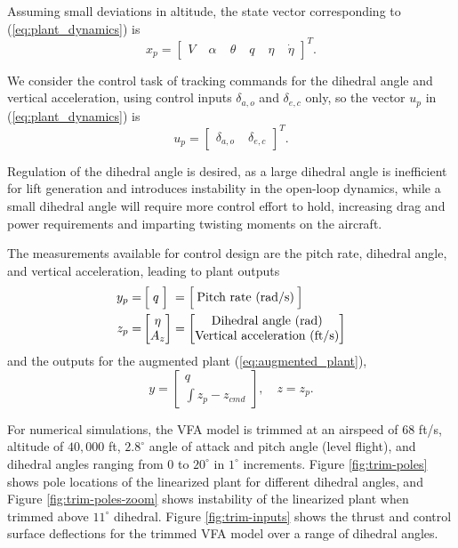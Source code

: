 \documentclass[english]{ifacconf}
\begin{document}
Assuming small deviations in altitude, the state vector corresponding to (\ref{eq:plant_dynamics}) is
\begin{equation}
	x_p = \begin{bmatrix}
V & \; \alpha & \; \theta & \; q & \; \eta & \; \dot{\eta}
\end{bmatrix}^T.
\end{equation}

We consider the control task of tracking commands for the dihedral angle and vertical acceleration, using control inputs $\delta_{a,o}$ and $\delta_{e,c}$ only, so the vector $u_p$ in (\ref{eq:plant_dynamics}) is
\begin{equation}
	u_p = \begin{bmatrix}
\delta_{a,o} & \; \delta_{e,c}
\end{bmatrix}^T.
\end{equation}

Regulation of the dihedral angle is desired, as a large dihedral angle is inefficient for lift generation and introduces instability in the open-loop dynamics, while a small dihedral angle will require more control effort to hold, increasing drag and power requirements and imparting twisting moments on the aircraft. 

The measurements available for control design are the pitch rate, dihedral angle, and vertical acceleration, leading to plant outputs
\begin{equation}
\begin{aligned}
y_p =& \, \Big[\; q \; \Big] \;= \Big[\: \text{Pitch rate (rad/s)} \:\Big] \\
z_p =& \begin{bmatrix}
\eta \\
A_z
\end{bmatrix} =\begin{bmatrix}
	$Dihedral angle (rad)$\\
	$Vertical acceleration (ft/s)$
\end{bmatrix}		
\end{aligned}
\end{equation}
and the outputs for the augmented plant (\ref{eq:augmented_plant}),
\begin{equation}
y = \begin{bmatrix}
	q \\ \int{z_p - z_{cmd}}
\end{bmatrix}, \quad z = z_p.
\end{equation}

For numerical simulations, the VFA model is trimmed at an airspeed of $68$ ft/s, altitude of $40,000$ ft, $2.8^\circ$ angle of attack and pitch angle (level flight), and dihedral angles ranging from $0$ to $20^\circ$ in $1^\circ$ increments. Figure \ref{fig:trim-poles} shows pole locations of the linearized plant for different dihedral angles, and Figure \ref{fig:trim-poles-zoom} shows instability of the linearized plant when trimmed above $11^\circ$ dihedral. Figure \ref{fig:trim-inputs} shows the thrust and control surface deflections for the trimmed VFA model over a range of dihedral angles.
\end{document}
